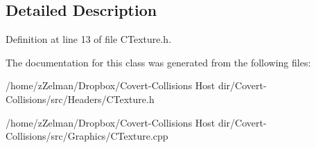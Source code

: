 \subsection{Detailed Description}


Definition at line 13 of file C\-Texture.\-h.



The documentation for this class was generated from the following files\-:\begin{DoxyCompactItemize}
\item 
/home/z\-Zelman/\-Dropbox/\-Covert-\/\-Collisions Host dir/\-Covert-\/\-Collisions/src/\-Headers/C\-Texture.\-h\item 
/home/z\-Zelman/\-Dropbox/\-Covert-\/\-Collisions Host dir/\-Covert-\/\-Collisions/src/\-Graphics/C\-Texture.\-cpp\end{DoxyCompactItemize}
